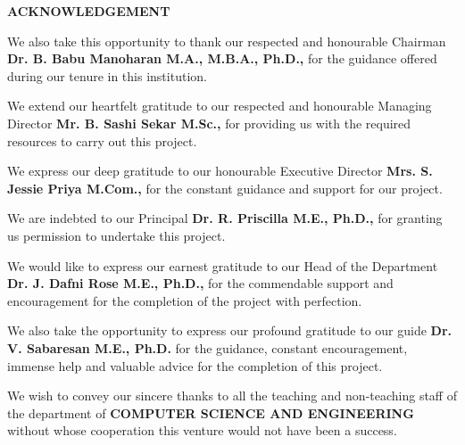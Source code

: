 
\clearpage
\thispagestyle{plain}

\begin{center}
  \vspace*{0.3cm}
  {\SubTitleSize\bfseries ACKNOWLEDGEMENT\par}
\end{center}

\vspace{0.5cm}

We also take this opportunity to thank our respected and honourable Chairman
\textbf{Dr. B. Babu Manoharan M.A., M.B.A., Ph.D.,} for the guidance offered
during our tenure in this institution.

We extend our heartfelt gratitude to our respected and honourable Managing
Director \textbf{Mr. B. Sashi Sekar M.Sc.,} for providing us with the required
resources to carry out this project.

We express our deep gratitude to our honourable Executive Director
\textbf{Mrs. S. Jessie Priya M.Com.,} for the constant guidance and support
for our project.

We are indebted to our Principal \textbf{Dr. R. Priscilla M.E., Ph.D.,} for
granting us permission to undertake this project.

We would like to express our earnest gratitude to our Head of the Department
\textbf{Dr. J. Dafni Rose M.E., Ph.D.,} for the commendable support and
encouragement for the completion of the project with perfection.

We also take the opportunity to express our profound gratitude to our guide
\textbf{Dr. V. Sabaresan M.E., Ph.D.} for the guidance, constant encouragement,
immense help and valuable advice for the completion of this project.

We wish to convey our sincere thanks to all the teaching and non-teaching staff
of the department of \textbf{COMPUTER SCIENCE AND ENGINEERING} without whose
cooperation this venture would not have been a success.
